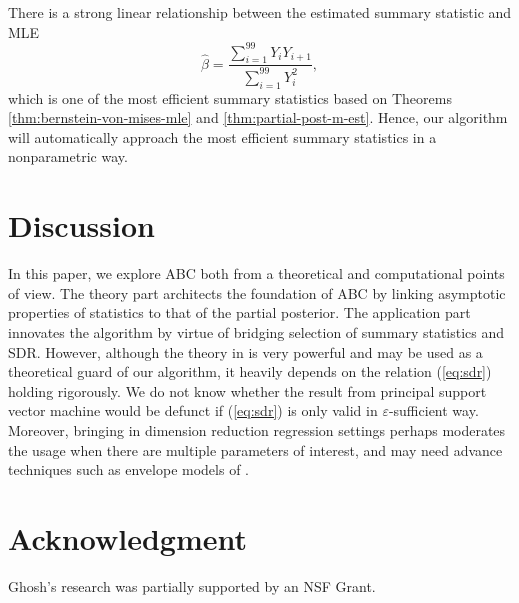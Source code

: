 \begin{example}
\begin{figure}
\end{figure}
There is a strong linear relationship between the estimated summary
statistic and MLE 
\[
\hat{\beta}=\frac{\sum_{i=1}^{99}Y_{i}Y_{i+1}}{\sum_{i=1}^{99}Y_{i}^{2}},
\]
which is one of the most efficient summary {{} } {statistics
} based on Theorems \ref{thm:bernstein-von-mises-mle} and \ref{thm:partial-post-m-est}.
Hence, our algorithm will automatically approach the most efficient
summary statistics in a nonparametric way. 
\end{example}

\section{\label{sec:Discussion}Discussion}

In this paper, we explore ABC both from a theoretical and computational
points of view. The theory part architects the foundation of ABC by
linking asymptotic properties of statistics to that of the partial
posterior. The application part innovates the algorithm by virtue
of bridging selection of summary statistics and SDR. However, although
the theory in \citet{li1992principal} is very powerful and may be
used as a theoretical guard of our algorithm, it heavily depends on
the relation (\ref{eq:sdr}) holding rigorously. We do not know whether
the result from principal support vector machine would be defunct
if (\ref{eq:sdr}) is only valid in $\varepsilon$-sufficient way.
Moreover, bringing in dimension reduction regression settings perhaps
moderates the usage when there are multiple parameters of interest,
and may need advance techniques such as envelope models of \citet{su2011partial,su2012inner}. 


\section*{Acknowledgment}

Ghosh's research was partially supported by an NSF Grant.
